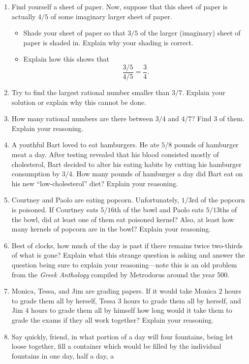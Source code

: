 \begin{problems}
\begin{enumerate}
\item Find yourself a sheet of paper. Now, suppose that this sheet of
  paper is actually $4/5$ of some imaginary larger sheet of
  paper. 
\begin{itemize}
\item Shade your sheet of paper so that $3/5$ of the larger
  (imaginary) sheet of paper is shaded in. Explain why your shading is
  correct.
\item Explain how this shows that 
\[
\frac{3/5}{4/5} = \frac{3}{4}.
\]
\end{itemize}
\item Try to find the largest rational number smaller than $3/7$.
  Explain your solution or explain why this cannot be done.
\item How many rational numbers are there between $3/4$ and $4/7$?
  Find $3$ of them. Explain your reasoning. 
\item A youthful Bart loved to eat hamburgers. He ate $5/8$ pounds of
  hamburger meat a day. After testing revealed that his blood
  consisted mostly of cholesterol, Bart decided to alter his eating
  habits by cutting his hamburger consumption by $3/4$. How many
  pounds of hamburger a day did Bart eat on his new
  ``low-cholesterol'' diet?  Explain your reasoning.
\item Courtney and Paolo are eating popcorn. Unfortunately, $1/3$rd of
  the popcorn is poisoned. If Courtney eats $5/16$th of the bowl and
  Paolo eats $5/13$ths of the bowl, did at least one of them eat
  poisoned kernel? Also, at least how many kernels of popcorn are in
  the bowl? Explain your reasoning.
\item Best of clocks, how much of the day is past if there remains
  twice two-thirds of what is gone? Explain what this strange question
  is asking and answer the question being sure to explain your
  reasoning---note this is an old problem from the \textit{Greek
    Anthology} compiled by Metrodorus around the year 500.
\item Monica, Tessa, and Jim are grading papers. If it would take
  Monica $2$ hours to grade them all by herself, Tessa $3$ hours to
  grade them all by herself, and Jim $4$ hours to grade them all by
  himself how long would it take them to grade the exams if they all
  work together? Explain your reasoning.
\item Say quickly, friend, in what portion of a day will four
  fountains, being let loose together, fill a container which would
  be filled by the individual fountains in one day, half a day, a

\end{enumerate}
\end{problems}

